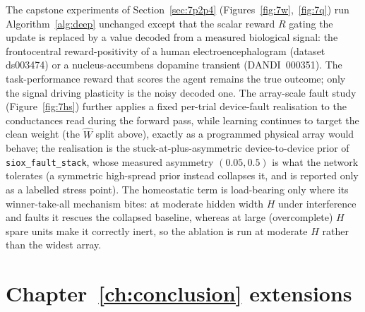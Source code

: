 \noindent The capstone experiments of Section~\ref{sec:7p2p4}
(Figures~\ref{fig:7w},~\ref{fig:7q}) run Algorithm~\ref{alg:deep} unchanged except that
the scalar reward $R$ gating the update is replaced by a value decoded from a measured
biological signal: the frontocentral reward-positivity of a human electroencephalogram
(dataset ds003474) or a nucleus-accumbens dopamine transient (DANDI~000351). The
task-performance reward that scores the agent remains the true outcome; only the signal
driving plasticity is the noisy decoded one. The array-scale fault study
(Figure~\ref{fig:7hs}) further applies a fixed per-trial device-fault realisation to the
conductances read during the forward pass, while learning continues to target the clean
weight (the $\widehat{W}$ split above), exactly as a programmed physical array would
behave; the realisation is the stuck-at-plus-asymmetric device-to-device prior of
\texttt{siox\_fault\_stack}, whose measured asymmetry $(0.05,0.5)$ is what the network
tolerates (a symmetric high-spread prior instead collapses it, and is reported only as a
labelled stress point). The homeostatic term is load-bearing only where its
winner-take-all mechanism bites: at moderate hidden width $H$ under interference and
faults it rescues the collapsed baseline, whereas at large (overcomplete) $H$ spare units
make it correctly inert, so the ablation is run at moderate $H$ rather than the widest
array.

\section{Chapter~\ref{ch:conclusion} extensions}
\label{app:alg-extensions}

